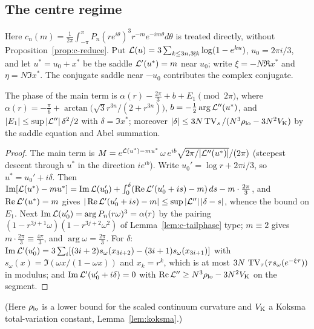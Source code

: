 \subsection{The centre regime}\label{sec:c-centre}

Here $c_n(m)=\frac1{2\pi}\int_{-\pi}^{\pi}P_n(re^{i\theta})^3r^{-m}e^{-im\theta}d\theta$ is treated directly, without
Proposition~\ref{prop:c-reduce}. Put $\mathcal L(u)=3\sum_{k\le3n,3\nmid k}\log(1-e^{ku})$, $u_0=2\pi i/3$, and let $u^*=u_0+x^*$
be the saddle $\mathcal L'(u^*)=m$ near $u_0$; write $\xi=-N\Re x^*$ and $\eta=N\Im x^*$. The conjugate saddle near $-u_0$
contributes the complex conjugate.

\begin{lemma}\label{lem:c-phase}
The phase of the main term is $\alpha(r)-\frac{2\pi}3+b+E_1\pmod{2\pi}$, where
$\alpha(r)=-\frac\pi6+\arctan\big(\sqrt3r^{3n}/(2+r^{3n})\big)$, $b=-\frac12\arg \mathcal L''(u^*)$, and
$|E_1|\le\sup|\mathcal L''|\,\delta^2/2$ with $\delta=\Im x^*$; moreover
$|\delta|\le3N\operatorname{TV}_s/(N^3\rho_{\rm lo}-3N^2V_{\rm K})$ by the saddle equation and Abel summation.
\end{lemma}
\begin{proof}
The main term is $M=e^{\mathcal L(u^*)-mu^*}\,\omega\,e^{ib}\sqrt{2\pi/|\mathcal L''(u^*)|}/(2\pi)$ (steepest descent through $u^*$ in the
direction $ie^{ib}$). Write $u_0'=\log r+2\pi i/3$, so $u^*=u_0'+i\delta$. Then
$\operatorname{Im}[\mathcal L(u^*)-mu^*]=\operatorname{Im} \mathcal L(u_0')+\int_0^\delta(\operatorname{Re} \mathcal L'(u_0'+is)-m)\,ds-m\cdot\frac{2\pi}3$, and $\operatorname{Re} \mathcal L'(u^*)=m$ gives
$|\operatorname{Re} \mathcal L'(u_0'+is)-m|\le\sup|\mathcal L''|\,|\delta-s|$, whence the bound on $E_1$. Next $\operatorname{Im} \mathcal L(u_0')=\arg P_n(r\omega)^3=\alpha(r)$
by the pairing $(1-r^{3j+1}\omega)(1-r^{3j+2}\omega^2)$ of Lemma~\ref{lem:c-tailphase} type; $m\equiv2$ gives
$m\cdot\frac{2\pi}3\equiv\frac{4\pi}3$, and $\arg\omega=\frac{2\pi}3$. For $\delta$:
$\operatorname{Im} \mathcal L'(u_0')=3\sum_i[(3i+2)s_\omega(x_{3i+2})-(3i+1)s_\omega(x_{3i+1})]$ with $s_\omega(x)=\Im(\omega x/(1-\omega x))$ and
$x_k=r^k$, which is at most $3N\,\operatorname{TV}_\tau(\tau s_\omega(e^{-\xi\tau}))$ in modulus; and $\operatorname{Im} \mathcal L'(u_0'+i\delta)=0$ with
$\operatorname{Re} \mathcal L''\ge N^3\rho_{\rm lo}-3N^2V_{\rm K}$ on the segment.
\end{proof}
(Here $\rho_{\rm lo}$ is a lower bound for the scaled continuum curvature and $V_{\rm K}$ a Koksma total-variation constant,
Lemma~\ref{lem:koksma}.)

